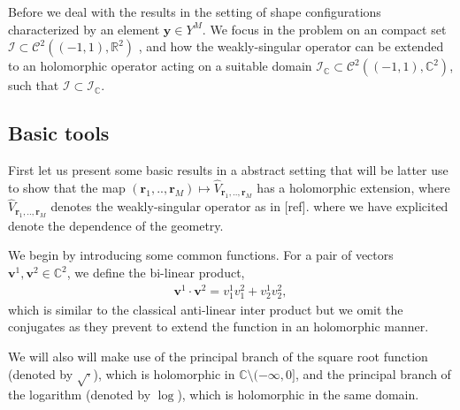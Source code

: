 \documentclass{article}
\newcommand{\todo}[1]{{\color{red}[#1]}}
\newcommand{\IC}{{\mathbb C}}
\newcommand{\IR}{{\mathbb R}}
\begin{document}
Before we deal with the results in the setting of shape configurations characterized by an element $\mathbf{y} \in Y^M$. We focus in the problem on an compact set $\mathcal{I} \subset \mathcal{C}^2((-1,1), \IR^2)$ , and how the weakly-singular operator can be extended to an holomorphic operator acting on a suitable domain $\mathcal{I}_{\mathbb{C}} \subset \mathcal{C}^2((-1,1), \IC^2)$, such that $\mathcal{I} \subset \mathcal{I}_{\mathbb{C}}$. 

\subsection{Basic tools}

First let us present some basic results in a abstract setting that will be latter use to show that the map $(\mathbf{r}_1,..,\mathbf{r}_M) \mapsto \widehat{V}_{\mathbf{r}_1,..,\mathbf{r}_M}$ has a holomorphic extension, where $\widehat{V}_{\mathbf{r}_1,..,\mathbf{r}_M}$ denotes the weakly-singular operator as in \todo{ref}. where we have explicited denote the dependence of the geometry. 

We begin by introducing some common functions. For a pair of vectors $\mathbf{v}^1, \mathbf{v}^2 \in \mathbb{C}^2$, we define the bi-linear product, 
\begin{align*}
\mathbf{v}^1 \cdot \mathbf{v}^2 =
v^1_1v^2_1+v^1_2v^2_2, 
\end{align*}
which is similar to the classical anti-linear inter product but we omit the conjugates as they prevent to extend the function in an holomorphic manner.  

We will also will make use of the principal branch of the square root function (denoted by $\sqrt{\cdot}$), which is holomorphic in $\mathbb{C} \setminus (-\infty,0]$, and the principal branch of the logarithm (denoted by $\log$), which is holomorphic in the same domain. 
\end{document}
